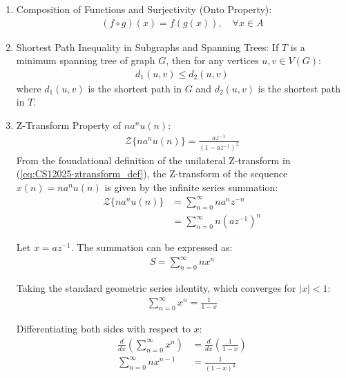 \begin{enumerate}[label=\thesubsection.\arabic*, ref=\thesubsection.\theenumi, itemsep=0.5cm]
\item Composition of Functions and Surjectivity (Onto Property):
\begin{align}
(f \circ g)(x) = f(g(x)), \quad \forall x \in A \label{eq:CS12025-function_composition}
\end{align}

\item Shortest Path Inequality in Subgraphs and Spanning Trees:
If $T$ is a minimum spanning tree of graph $G$, then for any vertices $u, v \in V(G)$:
\begin{align}
d_1(u, v) \le d_2(u, v) \label{eq:CS12025-shortest_path_mst}
\end{align}
where $d_1(u,v)$ is the shortest path in $G$ and $d_2(u,v)$ is the shortest path in $T$.

\item Z-Transform Property of $n a^n u(n)$:
\begin{align}
\mathcal{Z}\{n a^n u(n)\} = \frac{a z^{-1}}{(1 - a z^{-1})^2} \label{eq:CS12025-ztransform_n_an}
\end{align}
\solution
From the foundational definition of the unilateral Z-transform in (\ref{eq:CS12025-ztransform_def}), the Z-transform of the sequence $x(n) = n a^n u(n)$ is given by the infinite series summation:
\begin{align}
\mathcal{Z}\{n a^n u(n)\} &= \sum_{n=0}^{\infty} n a^n z^{-n} \\
                          &= \sum_{n=0}^{\infty} n (a z^{-1})^n
\end{align}

Let $x = a z^{-1}$. The summation can be expressed as:
\begin{align}
S = \sum_{n=0}^{\infty} n x^n
\end{align}

Taking the standard geometric series identity, which converges for $|x| < 1$:
\begin{align}
\sum_{n=0}^{\infty} x^n = \frac{1}{1 - x}
\end{align}

Differentiating both sides with respect to $x$:
\begin{align}
\frac{d}{dx} \left( \sum_{n=0}^{\infty} x^n \right) &= \frac{d}{dx} \left( \frac{1}{1 - x} \right) \\
\sum_{n=0}^{\infty} n x^{n-1} &= \frac{1}{(1 - x)^2}
\end{align}


\end{enumerate}

